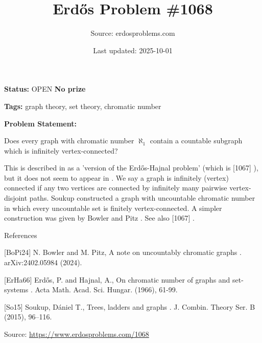\documentclass{article}
\title{Erd\H{o}s Problem \#1068}
\date{Last updated: 2025-10-01}
\author{Source: erdosproblems.com}
\begin{document}
\maketitle

\noindent\textbf{Status:} OPEN \quad \textbf{No prize}

\noindent\textbf{Tags:} graph theory, set theory, chromatic number

\medskip

\noindent\textbf{Problem Statement:}

Does every graph with chromatic number $\aleph_1$ contain a countable subgraph which is infinitely vertex-connected?




This is described in \cite{BoPi24} as a 'version of the Erd\H{o}s-Hajnal problem' (which is [1067] ), but it does not seem to appear in \cite{ErHa66}. We say a graph is infinitely (vertex) connected if any two vertices are connected by infinitely many pairwise vertex-disjoint paths. Soukup \cite{So15} constructed a graph with uncountable chromatic number in which every uncountable set is finitely vertex-connected. A simpler construction was given by Bowler and Pitz \cite{BoPi24}. See also [1067] .




References

[BoPi24] N. Bowler and M. Pitz, A note on uncountably chromatic graphs . arXiv:2402.05984 (2024).

[ErHa66] Erd\H{o}s, P. and Hajnal, A., On chromatic number of graphs and set-systems . Acta Math. Acad. Sci. Hungar. (1966), 61-99.

[So15] Soukup, D\'{a}niel T., Trees, ladders and graphs . J. Combin. Theory Ser. B (2015), 96--116.


\bigskip
\noindent\small{Source: \url{https://www.erdosproblems.com/1068}}
\end{document}
